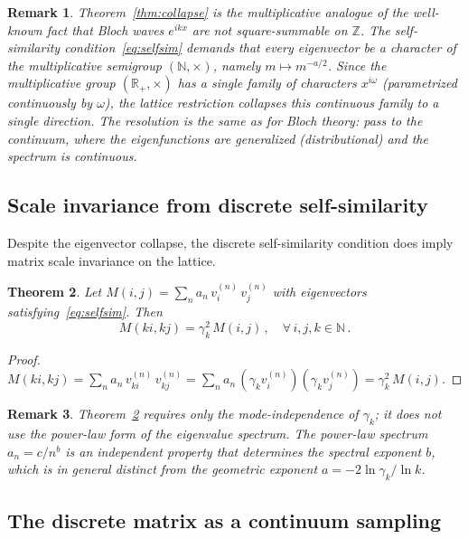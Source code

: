 \documentclass[12pt]{article}
\newtheorem{theorem}{Theorem}
\newtheorem{remark}[theorem]{Remark}
\begin{document}
\begin{remark}\label{rem:bloch}
Theorem~\ref{thm:collapse} is the multiplicative analogue of the well-known fact that Bloch waves $e^{ikx}$ are not square-summable on $\mathbb{Z}$. The self-similarity condition~\eqref{eq:selfsim} demands that every eigenvector be a character of the multiplicative semigroup $(\mathbb{N}, \times)$, namely $m \mapsto m^{-a/2}$. Since the multiplicative group $(\mathbb{R}_+, \times)$ has a single family of characters $x^{i\omega}$ (parametrized continuously by $\omega$), the lattice restriction collapses this continuous family to a single direction. The resolution is the same as for Bloch theory: pass to the continuum, where the eigenfunctions are generalized (distributional) and the spectrum is continuous.
\end{remark}


\subsection{Scale invariance from discrete self-similarity}

Despite the eigenvector collapse, the discrete self-similarity condition does imply matrix scale invariance on the lattice.

\begin{theorem}\label{thm:discretescale}
Let $M(i,j) = \sum_n a_n\, v^{(n)}_i\, v^{(n)}_j$ with eigenvectors satisfying~\eqref{eq:selfsim}. Then
\[
M(ki,kj) = \gamma_k^2\, M(i,j)\,, \quad \forall\, i,j,k \in \mathbb{N}\,.
\]
\end{theorem}

\begin{proof}
$M(ki,kj) = \sum_n a_n\, v^{(n)}_{ki}\, v^{(n)}_{kj} = \sum_n a_n\, (\gamma_k v^{(n)}_i)(\gamma_k v^{(n)}_j) = \gamma_k^2\, M(i,j)$.
\end{proof}

\begin{remark}
Theorem~\ref{thm:discretescale} requires only the mode-independence of $\gamma_k$; it does not use the power-law form of the eigenvalue spectrum. The power-law spectrum $a_n = c/n^b$ is an independent property that determines the spectral exponent $b$, which is in general distinct from the geometric exponent $a = -2\ln\gamma_k/\ln k$.
\end{remark}


\subsection{The discrete matrix as a continuum sampling}\label{sec:sampling}
\end{document}
